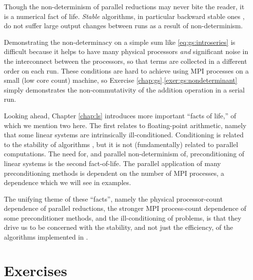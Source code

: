 Though the non-determinism of parallel reductions may never bite the reader, it is a numerical fact of life.  \emph{Stable} algorithms, in particular backward stable ones \citep{TrefethenBau1997}, do not suffer large output changes between runs as a result of non-determinism.

Demonstrating the non-determinacy on a simple sum like \eqref{eq:gs:introseries} is difficult because it helps to have many physical processors \emph{and} significant noise in the interconnect between the processors, so that terms are collected in a different order on each run.  These conditions are hard to achieve using MPI processes on a small (low core count) machine, so Exercise \ref{chap:gs}.\ref{exer:gs:nondeterminant} simply demonstrates the non-commutativity of the addition operation in a serial run.

Looking ahead, Chapter \ref{chap:ls} introduces more important ``facts of life,'' of which we mention two here.  The first relates to floating-point arithmetic, namely that some linear systems are intrinsically ill-conditioned.  Conditioning is related to the stability of algorithms \citep{TrefethenBau1997}, but it is not (fundamentally) related to parallel computations.  The need for, and parallel non-determinism of, preconditioning of linear systems is the second fact-of-life.  The parallel application of many preconditioning methods is dependent on the number of MPI processes, a dependence which we will see in examples.

The unifying theme of these ``facts'', namely the physical processor-count dependence of parallel reductions, the stronger MPI process-count dependence of some preconditioner methods, and the ill-conditioning of problems, is that they drive us to be concerned with the stability, and not just the efficiency, of the algorithms implemented in \PETSc.


\bigskip
\section{Exercises}

